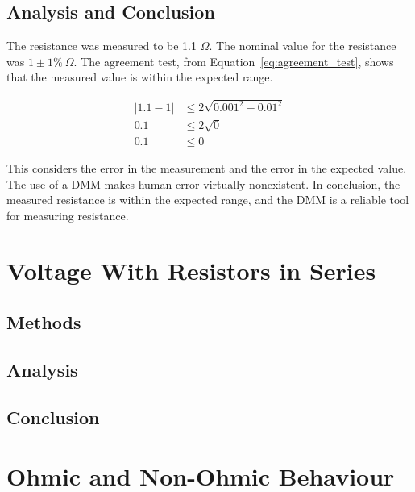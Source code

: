 \documentclass[11pt]{article}
\let\oldsection\section
\renewcommand\section{\clearpage\oldsection}
\begin{document}
    \subsection{Analysis and Conclusion}\label{subsec:resistance_analysis}

    The resistance was measured to be 1.1 $\Omega$.
    The nominal value for the resistance was $1 \pm 1\%~\Omega$.
    The agreement test, from Equation~\ref{eq:agreement_test}, shows that the measured value is within the expected range.
    \begin{e}
        \begin{align*}
            |1.1 - 1| &\le 2 \sqrt{0.001^2 - 0.01^2} \\
            0.1 &\le 2 \sqrt{0} \\
            0.1 &\le 0
        \end{align*}
    \end{e}

    This considers the error in the measurement and the error in the expected value.
    The use of a DMM makes human error virtually nonexistent.
    In conclusion, the measured resistance is within the expected range, and the DMM is a reliable tool for measuring resistance.

    \section{Voltage With Resistors in Series}\label{sec:voltage}

    \subsection{Methods}\label{subsec:voltage_methods}

    \subsection{Analysis}\label{subsec:voltage_analysis}

    \subsection{Conclusion}\label{subsec:voltage_conclusion}

    \section{Ohmic and Non-Ohmic Behaviour}\label{sec:ohmic}
\end{document}
